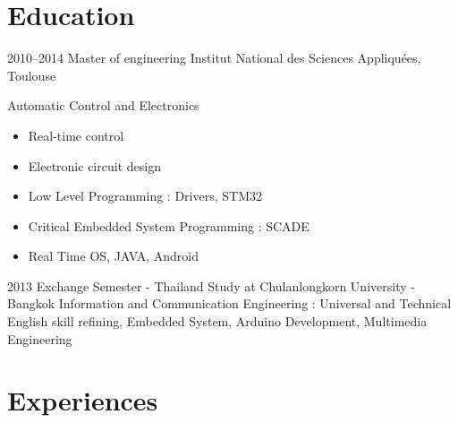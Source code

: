 \documentclass[a4paper]{friggeri-cv} %
\begin{document}
\section{Education}

\begin{entrylist}

\entry
{2010--2014}
{Master of engineering}
{Institut National des Sciences Appliquées, Toulouse}
{ Automatic Control and Electronics
\begin{itemize}
\item Real-time control 
\item Electronic circuit design
\item Low Level Programming : Drivers, STM32
\item Critical Embedded System Programming : SCADE
\item Real Time OS, JAVA, Android
\end{itemize}}


\entry
{2013}
{Exchange Semester - Thailand}
{Study at Chulanlongkorn University - Bangkok}
{Information and Communication Engineering : 
Universal and Technical English skill refining, Embedded System, Arduino Development, Multimedia Engineering}



\end{entrylist}


\section{Experiences}
\end{document}
